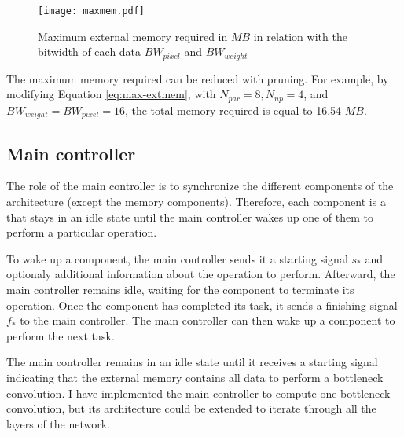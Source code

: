 %
\begin{figure}[H]
    \centering
    \texttt{[image: maxmem.pdf]}
    \caption{Maximum external memory required in $MB$ in relation with the bitwidth of each data $BW_{pixel}$ and $BW_{weight}$}
    \label{fig:max-mem}
\end{figure}
%
The maximum memory required can be reduced with pruning. For example, by modifying Equation \eqref{eq:max-extmem}, with $N_{par} = 8, N_{np} = 4$, and $BW_{weight} = BW_{pixel} = 16$, the total memory required is equal to 16.54 $MB$.
%
\subsection{Main controller}
%
The role of the main controller is to synchronize the different components of the architecture (except the memory components).  Therefore, each component is a  that stays in an idle state until the main controller wakes up one of them to perform a particular operation.

To wake up a component, the main controller sends it a starting signal $s_{*}$ and optionaly additional information about the operation to perform. Afterward, the main controller remains idle, waiting for the component to terminate its operation. Once the component has completed its task, it sends a finishing signal $f_{*}$ to the main controller. The main controller can then wake up a component to perform the next task.

The main controller remains in an idle state until it receives a starting signal indicating that the external memory contains all data to perform a bottleneck convolution. I have implemented the main controller to compute one bottleneck convolution, but its architecture could be extended to iterate through all the layers of the network.

